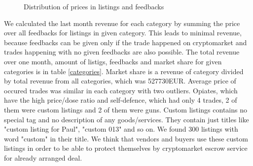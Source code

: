 \documentclass[
  digital, %
  table,   %
  lof,     %
  lot,     %
  oneside
]{fithesis3}
\begin{document}
\begin{figure}[!htb]
    
\caption[justification=centering]{Distribution of prices in listings and feedbacks\newline }
\end{figure}

We calculated the last month revenue for each category
by summing the price over all feedbacks for listings in given category.
This leads to minimal revenue, because feedbacks
can be given only if the trade happened on cryptomarket and 
trades happening with no given feedbacks are also possible.
The total revenue over one month, amount of listigs, feedbacks and market share for given categories 
is in table \ref{categories}.
Market share is a revenue of category divided by total revenue from all categories, which was 527730EUR.
Average price of occured trades was similar in each category
with two outliers. Opiates, which have the high price/dose ratio and 
self-defence, which had only 4 trades, 2 of them were custom listings and 2 of them were guns.
Custom listings contains no special tag and no description of any goods/services.
They contain just titles like "custom listing for Paul", "custom 013" and so on.
We found 300 listings with word "custom" in their title. 
We think that vendors and buyers use these custom listings in order to be able to protect themselves
by cryptomarket escrow service for already arranged deal.
\end{document}
